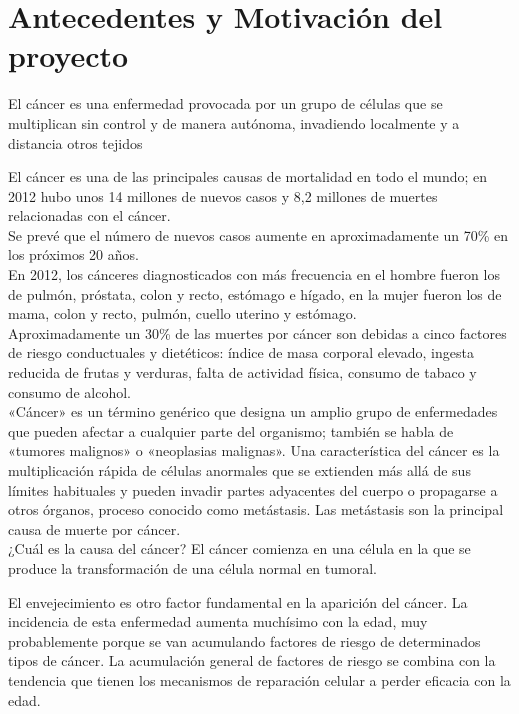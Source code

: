 \documentclass[../pfc.tex]{subfiles}
\begin{document}
\section{Antecedentes y Motivación del proyecto}
El cáncer es una enfermedad provocada por un grupo de células que se multiplican sin control y de manera autónoma, invadiendo localmente y a distancia otros tejidos

El cáncer es una de las principales causas de mortalidad en todo el mundo; en 2012 hubo unos 14 millones de nuevos casos y 8,2 millones de muertes relacionadas con el cáncer.\\

Se prevé que el número de nuevos casos aumente en aproximadamente un 70\% en los próximos 20 años.\\
En 2012, los cánceres diagnosticados con más frecuencia en el hombre fueron los de pulmón, próstata, colon y recto, estómago e hígado, en la mujer fueron los de mama, colon y recto, pulmón, cuello uterino y estómago.\\

Aproximadamente un 30\% de las muertes por cáncer son debidas a cinco factores de riesgo conductuales y dietéticos: índice de masa corporal elevado, ingesta reducida de frutas y verduras, falta de actividad física, consumo de tabaco y consumo de alcohol.\\

«Cáncer» es un término genérico que designa un amplio grupo de enfermedades que pueden afectar a cualquier parte del organismo; también se habla de «tumores malignos» o «neoplasias malignas». Una característica del cáncer es la multiplicación rápida de células anormales que se extienden más allá de sus límites habituales y pueden invadir partes adyacentes del cuerpo o propagarse a otros órganos, proceso conocido como metástasis. Las metástasis son la principal causa de muerte por cáncer.\\

¿Cuál es la causa del cáncer?
El cáncer comienza en una célula en la que se produce la transformación de una célula normal en tumoral.

El envejecimiento es otro factor fundamental en la aparición del cáncer. La incidencia de esta enfermedad aumenta muchísimo con la edad, muy probablemente porque se van acumulando factores de riesgo de determinados tipos de cáncer. La acumulación general de factores de riesgo se combina con la tendencia que tienen los mecanismos de reparación celular a perder eficacia con la edad.\\
\end{document}
